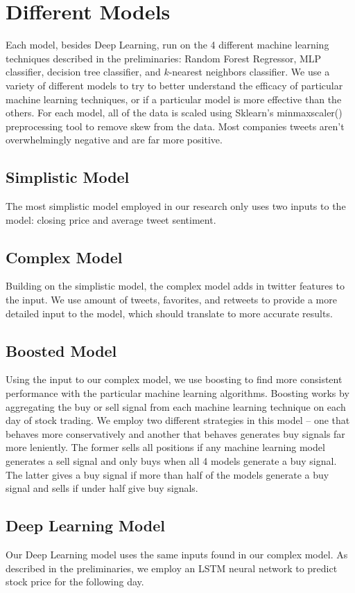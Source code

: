 \documentclass[../thesis.tex]{subfiles}
\begin{document}

\section{Different Models}

Each model, besides Deep Learning, run on the 4 different machine learning techniques described in the preliminaries: Random Forest Regressor, MLP classifier, decision tree classifier, and $k$-nearest neighbors classifier. We use a variety of different models to try to better understand the efficacy of particular machine learning techniques, or if a particular model is more effective than the others. For each model, all of the data is scaled using Sklearn's minmaxscaler() preprocessing tool to remove skew from the data. Most companies tweets aren't overwhelmingly negative and are far more positive.

\subsection{Simplistic Model}

The most simplistic model employed in our research only uses two inputs to the model: closing price and average tweet sentiment.

\subsection{Complex Model}

Building on the simplistic model, the complex model adds in twitter features to the input. We use amount of tweets, favorites, and retweets to provide a more detailed input to the model, which should translate to more accurate results. 

\subsection{Boosted Model}

Using the input to our complex model, we use boosting to find more consistent performance with the particular machine learning algorithms. Boosting works by aggregating the buy or sell signal from each machine learning technique on each day of stock trading. We employ two different strategies in this model -- one that behaves more conservatively and another that behaves generates buy signals far more leniently. The former sells all positions if any machine learning model generates a sell signal and only buys when all 4 models generate a buy signal. The latter gives a buy signal if more than half of the models generate a buy signal and sells if under half give buy signals.

\subsection{Deep Learning Model}

Our Deep Learning model uses the same inputs found in our complex model. As described in the preliminaries, we employ an LSTM neural network to predict stock price for the following day. 
\end{document}
